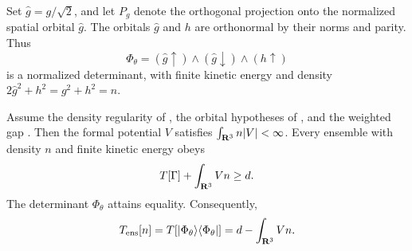 Set $\widehat g=g/\sqrt2$, and let $P_g$ denote the orthogonal projection
onto the normalized spatial orbital $\widehat g$.  The orbitals
$\widehat g$ and $h$ are orthonormal by their norms and parity.  Thus
\begin{equation}
 \Phi_\theta
 = (\widehat g\uparrow)\wedge(\widehat g\downarrow)\wedge(h\uparrow)
 \label{eq:ensemble-determinant}
\end{equation}
is a normalized determinant, with finite kinetic energy and density
$2\widehat g^2+h^2=g^2+h^2=n$.

\begin{proposition}
\label{prop:ensemble-certificate}
Assume the density regularity of , the
orbital hypotheses of , and the weighted
gap .  Then the formal potential $V$ satisfies
$\int_{\mathbf R^3}n|V|<\infty$.  Every ensemble with density $n$ and finite
kinetic energy obeys
\begin{equation}
 T[\Gamma]+\int_{\mathbf R^3}Vn\ge d.
 \label{eq:ensemble-certificate}
\end{equation}
The determinant $\Phi_\theta$ attains equality.  Consequently,
\begin{equation}
 T_{\mathrm{ens}}[n]
 =T[|\Phi_\theta\rangle\langle\Phi_\theta|]
 =d-\int_{\mathbf R^3}Vn.
 \label{eq:ensemble-minimum}
\end{equation}
\end{proposition}

